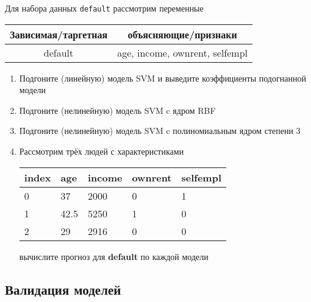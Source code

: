 \begin{exercise}
Для набора данных \texttt{default} рассмотрим переменные

\begin{center}
	\begin{tabular}{|c|c|} \hline
		Зависимая/таргетная & объясняющие/признаки \\ \hline
		default & age, income, ownrent, selfempl \\ \hline
	\end{tabular}
\end{center}

\begin{enumerate}
	\item Подгоните (линейную) модель SVM и выведите коэффициенты подогнанной модели
	\item Подгоните (нелинейную) модель SVM c ядром RBF
	\item Подгоните (нелинейную) модель SVM c полиномиальным ядром степени 3
	\item Рассмотрим трёх людей с характеристиками
	\begin{center}
		\begin{tabular}{|l||l|l|l|l|}\hline
			index & age & income & ownrent & selfempl  \\ \hline\hline
			0 & 37 & 2000 & 0 & 1  \\
			1 & 42.5 & 5250 & 1 & 0  \\
			2 & 29 & 2916 & 0 & 0  \\ \hline
		\end{tabular}
	\end{center}
	вычислите прогноз для \textbf{default} по каждой модели
\end{enumerate}
\end{exercise}
	
\subsection{Валидация моделей}

